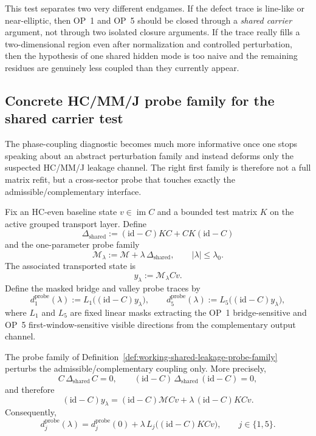\begin{remark}
\label{rem:working-last-shared-phase-diagnostic}
This test separates two very different endgames. If the defect trace is line-like or near-elliptic, then OP~1 and OP~5 should be closed through a \emph{shared carrier} argument, not through two isolated closure arguments. If the trace really fills a two-dimensional region even after normalization and controlled perturbation, then the hypothesis of one shared hidden mode is too naive and the remaining residues are genuinely less coupled than they currently appear.
\end{remark}


\subsection*{Concrete HC/MM/J probe family for the shared carrier test}
The phase-coupling diagnostic becomes much more informative once one stops speaking about an abstract perturbation family and instead deforms only the suspected HC/MM/J leakage channel. The right first family is therefore not a full matrix refit, but a cross-sector probe that touches exactly the admissible/complementary interface.

\begin{definition}
\label{def:working-shared-leakage-probe-family}
Fix an HC-even baseline state \(v\in \operatorname{im} C\) and a bounded test matrix \(K\) on the active grouped transport layer. Define
\[
  \Delta_{\mathrm{shared}}:=(\mathrm{id}-C)KC + CK(\mathrm{id}-C)
\]
and the one-parameter probe family
\[
  \mathcal M_\lambda:=\mathcal M+\lambda\,\Delta_{\mathrm{shared}},
  \qquad |
  \lambda|\le \lambda_0.
\]
The associated transported state is
\[
  y_\lambda:=\mathcal M_\lambda C v.
\]
Define the masked bridge and valley probe traces by
\[
  d^{\mathrm{probe}}_1(\lambda):=L_1\bigl((\mathrm{id}-C)y_\lambda\bigr),
  \qquad
  d^{\mathrm{probe}}_5(\lambda):=L_5\bigl((\mathrm{id}-C)y_\lambda\bigr),
\]
where \(L_1\) and \(L_5\) are fixed linear masks extracting the OP~1 bridge-sensitive and OP~5 first-window-sensitive visible directions from the complementary output channel.
\end{definition}

\begin{proposition}
\label{prop:working-first-order-shared-leakage-isolation}
The probe family of Definition~\ref{def:working-shared-leakage-probe-family} perturbs the admissible/complementary coupling only. More precisely,
\[
  C\,\Delta_{\mathrm{shared}}\,C = 0,
  \qquad
  (\mathrm{id}-C)\,\Delta_{\mathrm{shared}}\,(\mathrm{id}-C)=0,
\]
and therefore
\[
  (\mathrm{id}-C)y_\lambda
  = (\mathrm{id}-C)\mathcal M C v + \lambda\,(\mathrm{id}-C)KC v.
\]
Consequently,
\[
  d^{\mathrm{probe}}_j(\lambda)=d^{\mathrm{probe}}_j(0)+\lambda\,L_j\bigl((\mathrm{id}-C)KC v\bigr),
  \qquad j\in\{1,5\}.
\]
\end{proposition}

